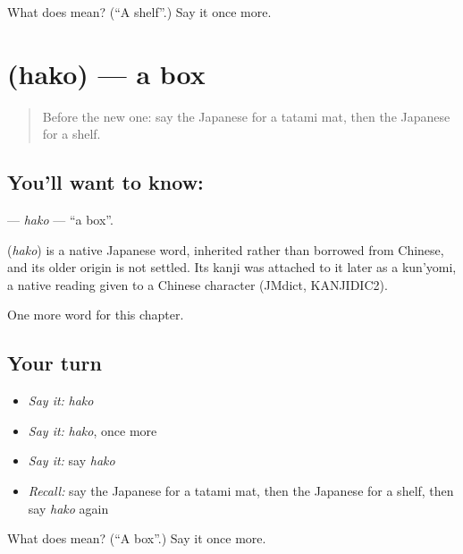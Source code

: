 \begin{tcolorbox}[breakable,colback=teal!4,colframe=teal!35!black,title={Before you move on}]
What does  mean? (\textquotedblleft{}A shelf\textquotedblright{}.) Say it once more.
\end{tcolorbox}
\section[\texorpdfstring{\ja{はこ} (hako)}{はこ (hako)}]{ (hako) — a box}

\label{lesson:JA-C39-hako}



\begin{quote}
Before the new one: say the Japanese for a tatami mat, then the Japanese for a shelf.
\end{quote}

\subsection*{You'll want to know: }
\textbf{} — \emph{hako} — \textquotedblleft{}a box\textquotedblright{}.

\begin{cousinweb}
\textbf{} (\emph{hako}) is a native Japanese word, inherited rather than borrowed from Chinese, and its older origin is not settled. Its kanji was attached to it later as a kun'yomi, a native reading given to a Chinese character (JMdict, KANJIDIC2).
\end{cousinweb}

\begin{grammarlens}[title={What you've built}]
One more word for this chapter.
\end{grammarlens}

\subsection*{Your turn}
\begin{itemize}
\raggedright
  \item \emph{Say it:} \emph{hako}
  \item \emph{Say it:} \emph{hako}, once more
  \item \emph{Say it:} say \emph{hako}
  \item \emph{Recall:} say the Japanese for a tatami mat, then the Japanese for a shelf, then say \emph{hako} again
\end{itemize}

\begin{tcolorbox}[breakable,colback=teal!4,colframe=teal!35!black,title={Before you move on}]
What does  mean? (\textquotedblleft{}A box\textquotedblright{}.) Say it once more.
\end{tcolorbox}
